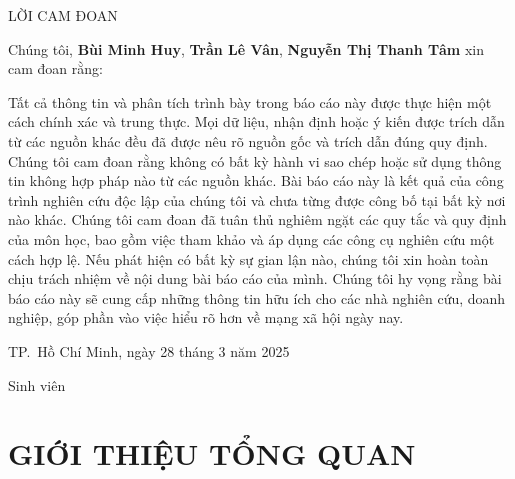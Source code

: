 \documentclass[
]{article}
\author{}
\date{\vspace{-2.5em}}
\begin{document}


\newpage
\thispagestyle{empty}

\begin{center}
    \LARGE {LỜI CAM ĐOAN}
\end{center}
\vspace{1.5em}

Chúng tôi, \textbf{Bùi Minh Huy}, \textbf{Trần Lê Vân}, \textbf{Nguyễn
Thị Thanh Tâm} xin cam đoan rằng:

Tất cả thông tin và phân tích trình bày trong báo cáo này được thực hiện
một cách chính xác và trung thực. Mọi dữ liệu, nhận định hoặc ý kiến
được trích dẫn từ các nguồn khác đều đã được nêu rõ nguồn gốc và trích
dẫn đúng quy định. Chúng tôi cam đoan rằng không có bất kỳ hành vi sao
chép hoặc sử dụng thông tin không hợp pháp nào từ các nguồn khác. Bài
báo cáo này là kết quả của công trình nghiên cứu độc lập của chúng tôi
và chưa từng được công bố tại bất kỳ nơi nào khác. Chúng tôi cam đoan đã
tuân thủ nghiêm ngặt các quy tắc và quy định của môn học, bao gồm việc
tham khảo và áp dụng các công cụ nghiên cứu một cách hợp lệ. Nếu phát
hiện có bất kỳ sự gian lận nào, chúng tôi xin hoàn toàn chịu trách nhiệm
về nội dung bài báo cáo của mình. Chúng tôi hy vọng rằng bài báo cáo này
sẽ cung cấp những thông tin hữu ích cho các nhà nghiên cứu, doanh
nghiệp, góp phần vào việc hiểu rõ hơn về mạng xã hội ngày nay.

\vspace{3em}

\begin{flushright}
\begin{minipage}{0.5\textwidth}
\raggedleft
TP.\ Hồ Chí Minh, ngày 28 tháng 3 năm 2025

\vspace{1em}

\centering
{\LARGE Sinh viên}
\end{minipage}
\end{flushright}

\newpage
\thispagestyle{empty}
\tableofcontents

\newpage
\thispagestyle{empty}
\listoffigures

\newpage
{}
\setcounter{page}{1}

\newpage

\section{GIỚI THIỆU TỔNG
QUAN}\label{giux1edbi-thiux1ec7u-tux1ed5ng-quan}
\end{document}
